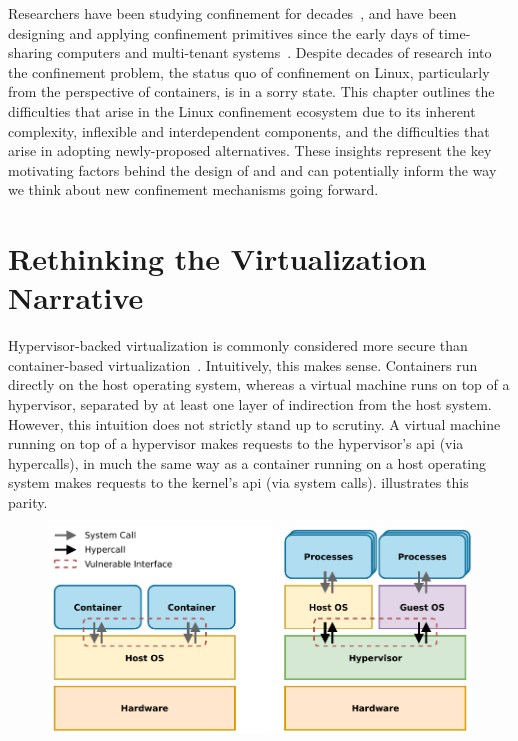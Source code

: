 \begin{inprogress}
Researchers have been studying confinement for decades~\cite{lampson1973_confinement}, and
have been designing and applying confinement primitives since the early days of
time-sharing computers and multi-tenant systems~\cite{shu2016_security_isolation_study}.
Despite decades of research into the confinement problem, the status quo of confinement on
Linux, particularly from the perspective of containers, is in a sorry state. This chapter
outlines the difficulties that arise in the Linux confinement ecosystem due to its
inherent complexity, inflexible and interdependent components, and the difficulties that
arise in adopting newly-proposed alternatives. These insights represent the key
motivating factors behind the design of \bpfbox{} and \bpfcontain{} and can potentially
inform the way we think about new confinement mechanisms going forward.
\end{inprogress}

\section{Rethinking the Virtualization Narrative}%
\label{s:rethinking-virtualization}

Hypervisor-backed virtualization is commonly considered more secure than container-based
virtualization~\cite{sultan2019_container_security, eder2016_hypervisor_container}.
Intuitively, this makes sense. Containers run directly on the host operating system,
whereas a virtual machine runs on top of a hypervisor, separated by at least one layer of
indirection from the host system. However, this intuition does not strictly stand up to
scrutiny. A virtual machine running on top of a hypervisor makes requests to the
hypervisor's \gls{api} (via hypercalls), in much the same way as a container running on
a host operating system makes requests to the kernel's \gls{api} (via system calls).
 illustrates this parity.

\begin{figure}[htbp]
  \centering
  \includegraphics[width=0.8\linewidth]{figs/confinement-problem/syscall-hypercall.pdf}
  \caption[]{
  }%
  \label{fig:syscall-hypercall}
\end{figure}


